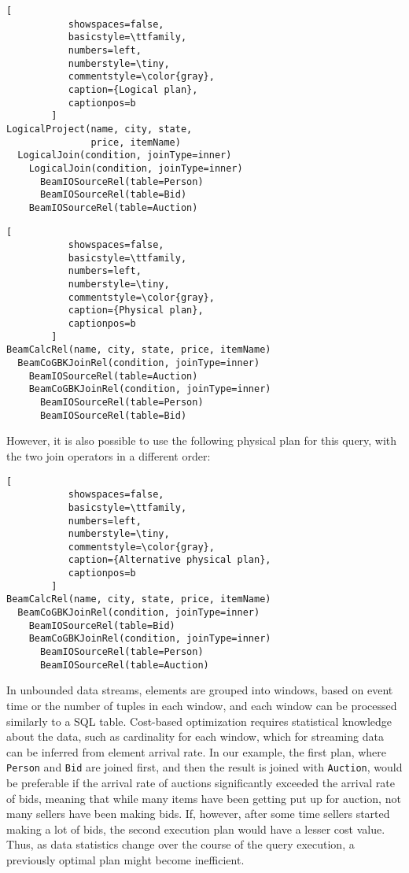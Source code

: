 \begin{lstlisting}[
           showspaces=false,
           basicstyle=\ttfamily,
           numbers=left,
           numberstyle=\tiny,
           commentstyle=\color{gray},
           caption={Logical plan}, 
           captionpos=b
        ]
LogicalProject(name, city, state, 
               price, itemName)
  LogicalJoin(condition, joinType=inner) 
    LogicalJoin(condition, joinType=inner)
      BeamIOSourceRel(table=Person)
      BeamIOSourceRel(table=Bid)
    BeamIOSourceRel(table=Auction)
\end{lstlisting}

\begin{lstlisting}[
           showspaces=false,
           basicstyle=\ttfamily,
           numbers=left,
           numberstyle=\tiny,
           commentstyle=\color{gray},
           caption={Physical plan}, 
           captionpos=b
        ]
BeamCalcRel(name, city, state, price, itemName)
  BeamCoGBKJoinRel(condition, joinType=inner)
    BeamIOSourceRel(table=Auction)
    BeamCoGBKJoinRel(condition, joinType=inner)
      BeamIOSourceRel(table=Person)
      BeamIOSourceRel(table=Bid)
\end{lstlisting}


However, it is also possible to use the following physical plan for this query, with the two join operators in a different order: \\

\begin{lstlisting}[
           showspaces=false,
           basicstyle=\ttfamily,
           numbers=left,
           numberstyle=\tiny,
           commentstyle=\color{gray},
           caption={Alternative physical plan}, 
           captionpos=b
        ]
BeamCalcRel(name, city, state, price, itemName)
  BeamCoGBKJoinRel(condition, joinType=inner)
    BeamIOSourceRel(table=Bid)
    BeamCoGBKJoinRel(condition, joinType=inner)
      BeamIOSourceRel(table=Person)
      BeamIOSourceRel(table=Auction)
\end{lstlisting}


In unbounded data streams, elements are grouped into windows, based on event time or the number of tuples in each window, and each window can be processed similarly to a SQL table. Cost-based optimization requires statistical knowledge about the data, such as cardinality for each window, which for streaming data can be inferred from element arrival rate. In our example, the first plan, where \texttt{Person} and \texttt{Bid} are joined first, and then the result is joined with \texttt{Auction}, would be preferable if the arrival rate of auctions significantly exceeded the arrival rate of bids, meaning that while many items have been getting put up for auction, not many sellers have been making bids. If, however, after some time sellers started making a lot of bids, the second execution plan would have a lesser cost value. Thus, as data statistics change over the course of the query execution, a previously optimal plan might become inefficient. 

